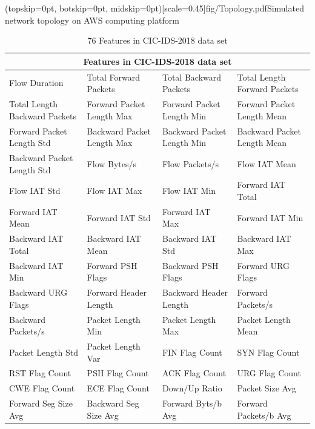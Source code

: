 \documentclass{ieeeaccess}
\theoremstyle{definition}
\begin{document}
\Figure[!htpb](topskip=0pt, botskip=0pt, midskip=0pt)[scale=0.45]{fig/Topology.pdf}{Simulated network topology on AWS computing platform\label{fig:topology}}

\begin{table}[!htpb]
    \caption{76 Features in CIC-IDS-2018 data set}
    \label{tab:features}
    \centering
    \begin{tabular}{llll}
    \toprule
    \multicolumn{4}{c}{Features in CIC-IDS-2018 data set} \\
    \midrule
    Flow Duration & Total Forward Packets & Total Backward Packets & Total Length Forward Packets \\
    Total Length Backward Packets & Forward Packet Length Max & Forward Packet Length Min & Forward Packet Length Mean \\
    Forward Packet Length Std & Backward Packet Length Max & Backward Packet Length Min & Backward Packet Length Mean \\
    Backward Packet Length Std & Flow Bytes/s & Flow Packets/s & Flow IAT Mean \\
    Flow IAT Std & Flow IAT Max & Flow IAT Min & Forward IAT Total \\
    Forward IAT Mean & Forward IAT Std & Forward IAT Max & Forward IAT Min \\
    Backward IAT Total & Backward IAT Mean & Backward IAT Std & Backward IAT Max \\
    Backward IAT Min & Forward PSH Flags & Backward PSH Flags & Forward URG Flags \\
    Backward URG Flags & Forward Header Length & Backward Header Length & Forward Packets/s \\
    Backward Packets/s & Packet Length Min & Packet Length Max & Packet Length Mean \\
    Packet Length Std &  Packet Length Var & FIN Flag Count & SYN Flag Count \\
    RST Flag Count & PSH Flag Count & ACK Flag Count & URG Flag Count \\
    CWE Flag Count & ECE Flag Count & Down/Up Ratio & Packet Size Avg \\
    Forward Seg Size Avg & Backward Seg Size Avg & Forward Byts/b Avg & Forward Packets/b Avg \\

\end{tabular}
\end{table}
\end{document}
